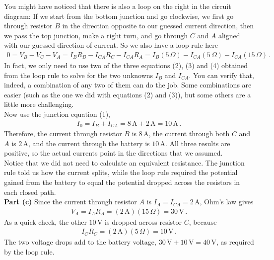 \documentclass[11pt]{article}
\begin{document}
You might have noticed that there is also a loop on the right in the circuit diagram: If we start from the bottom junction and go clockwise, we first go through resistor $B$ in the direction opposite to our guessed current direction, then we pass the top junction, make a right turn, and go through $C$ and $A$ aligned with our guessed direction of current. So we also have a loop rule here
\begin{align*}
0 = V_B - V_C-V_A =I_BR_B - I_{CA}R_C-I_{CA}R_A=I_B (5\,\Omega) - I_{CA}(5\,\Omega) - I_{CA}(15\,\Omega)\,. \tag{4}
\end{align*}
In fact, we only need to use two of the three equations (2), (3) and (4) obtained from the loop rule to solve for the two unknowns $I_B$ and $I_{CA}$. You can verify that, indeed, a combination of any two of them can do the job. Some combinations are easier (such as the one we did with equations (2) and (3)), but some others are a little more challenging.\\

Now use the junction equation (1),
\begin{align*}
I_0=I_B+I_{CA}=8\,\text{A}+2\,\text{A}=10\,\text{A}\,.
\end{align*}
Therefore, the current through resistor $B$ is $8$\,A, the current through both $C$ and $A$ is $2$\,A, and the current through the battery is $10$\,A. All three results are positive, so the actual currents point in the directions that we assumed.\\

\noindent Notice that we did not need to calculate an equivalent resistance. The junction rule told us how the current splits, while the loop rule required the potential gained from the battery to equal the potential dropped across the resistors in each closed path.\\

\noindent\textbf{Part (c)} Since the current through resistor $A$ is $I_A=I_{CA}=2$\,A, Ohm's law gives
\begin{align*}
V_A=I_AR_A=(2\,\text{A})(15\,\Omega)=30\,\text{V}\,.
\end{align*}
As a quick check, the other $10$\,V is dropped across resistor $C$, because
\begin{align*}
I_CR_C=(2\,\text{A})(5\,\Omega)=10\,\text{V}\,.
\end{align*}
The two voltage drops add to the battery voltage, $30\,\text{V}+10\,\text{V}=40\,\text{V}$, as required by the loop rule.\\
\end{document}
